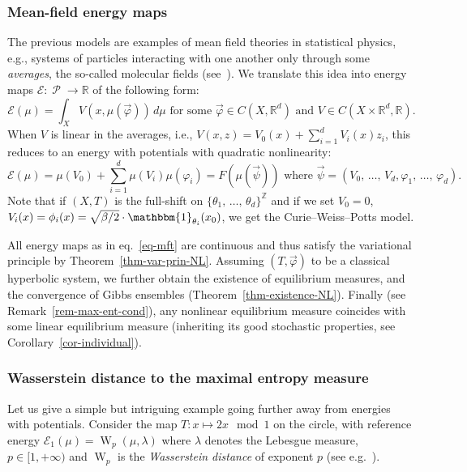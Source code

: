 \documentclass[10pt]{amsart}
\theoremstyle{definition}\newtheorem{defi}[theo]{Definition}\newtheorem{rema}[theo]{Remark}\newtheorem{exam}[theo]{Example}\newtheorem{exem}[theo]{Example}\newtheorem{nota}[theo]{Notation}
\theoremstyle{plain}
\theoremstyle{plain}
\newcommand{\wass}{\operatorname{W}}
\newcommand\Prob{{\operatorname{\mathscr{P}}}}
\newcommand{\pot}{\varphi}
\newcommand*\8{\infty}
\newcommand\RR{\mathbb{R}}
\newcommand\ZZ{\mathbb{Z}}
\newcommand{\En}{\mathcal{E}}
\begin{document}
\subsubsection{Mean-field energy maps}\label{subsubsec-mft}
The previous models are examples of mean field theories in statistical physics, e.g., systems of particles interacting with one another only through some \emph{averages}, the so-called molecular fields (see~\cite[Sections~10.5, 10.7]{Reif}). We translate this idea into energy maps $\En:\Prob\to\RR$ of the following form:
\begin{equation}\label{eq-mft}
\En(\mu) = \int_X V(x,\mu(\vec\pot))\, d\mu \text{ for some }\vec\pot\in C(X,\RR^d)\text{ and }V\in C(X\times\RR^d,\RR).
\end{equation}
When $V$ is linear in the averages, i.e., $V(x, z)=V_0(x)+\sum_{i=1}^d V_i(x)z_i$, this reduces to an energy with potentials with quadratic nonlinearity:
\[
\En(\mu)=\mu(V_0)+\sum_{i=1}^d \mu(V_i)\mu(\pot_i)=F(\mu(\vec\psi))
\text{ where }\vec\psi=(V_0,\,\dots,\,V_d,\pot_1,\,\dots,\,\pot_d).
\]
Note that if $(X,T)$ is the full-shift on $\{\theta_1,\,\dots,\,\theta_d\}^\ZZ$ and if we set $V_0=0$, $V_i(x)=\phi_i(x)=\sqrt{\beta/2}\cdot \mathbbm{1}_{\theta_i}(x_0)$, we get the Curie--Weiss--Potts model.

All energy maps as in eq.~\eqref{eq-mft} are continuous and thus satisfy the variational principle by Theorem~\ref{thm-var-prin-NL}. Assuming $(T,\vec\pot)$ to be a classical hyperbolic system, we further obtain the existence of equilibrium measures, and the convergence of Gibbs ensembles (Theorem~\ref{thm-existence-NL}). Finally (see Remark~\ref{rem-max-ent-cond}), any nonlinear equilibrium measure coincides with some linear equilibrium measure (inheriting its good stochastic properties, see Corollary~\ref{cor-individual}).


\subsubsection{Wasserstein distance to the maximal entropy measure}\label{sec-Wasserstein}

Let us give a simple but intriguing example going further away from energies with potentials. Consider the map $T:x\mapsto 2 x \mod 1 $ on the circle, with reference energy $\En_{1}(\mu)=\wass_p(\mu,\lambda)$ where $\lambda$ denotes the Lebesgue measure, $p\in[1,+\infty)$ and $\wass_p$ is the \emph{Wasserstein distance} of exponent $p$ (see e.g.~\cite{Villani-book}).
\end{document}

